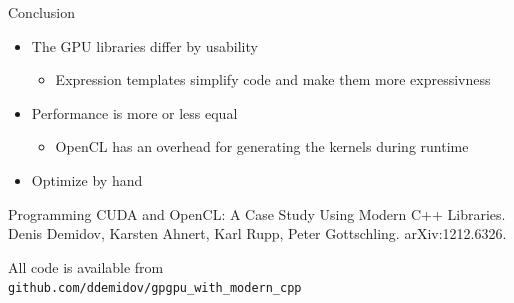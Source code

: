\documentclass{beamer}
\newcommand{\rem}[1]{}
\newcommand{\heading}[1]{\centerline{\Large #1} \vspace{0.5em}}
\begin{document}
\begin{frame}[fragile]
 \heading{Conclusion}

 \begin{itemize}
  \item The GPU libraries differ by usability
  \begin{itemize} \item Expression templates simplify code and make them more expressivness \end{itemize}
  \item Performance is more or less equal
  \begin{itemize} \item OpenCL has an overhead for generating the kernels during runtime \end{itemize}
  \item Optimize by hand
 \end{itemize}

 \vspace{2ex}
 {\scriptsize Programming CUDA and OpenCL: A Case Study Using Modern C++ Libraries. Denis Demidov, Karsten Ahnert, Karl Rupp, Peter Gottschling. arXiv:1212.6326.}

 \vspace{4ex}
 \begin{center}
   \rem{\scriptsize} All code is available from \\ {\tt github.com/ddemidov/gpgpu\_with\_modern\_cpp}
 \end{center}

\end{frame}





\rem{




%



%
}
\end{document}
